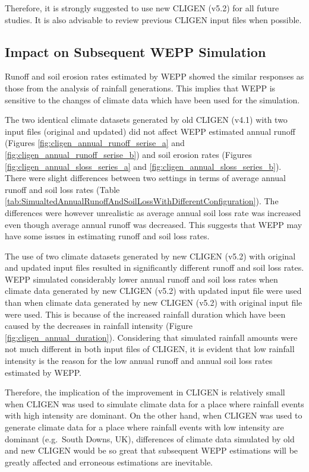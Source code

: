 Therefore, it is strongly suggested to use new CLIGEN (v5.2) for all future
studies. It is also advisable to review previous CLIGEN input files when
possible.

\subsection{Impact on Subsequent WEPP Simulation}

Runoff and soil erosion rates estimated by WEPP showed the similar responses as
those from the analysis of rainfall generations. This implies that WEPP is
sensitive to the changes of climate data which have been used for the
simulation.

The two identical climate datasets generated by old CLIGEN (v4.1) with two input
files (original and updated) did not affect WEPP estimated annual runoff
(Figures \ref{fig:cligen_annual_runoff_serise_a} and
\ref{fig:cligen_annual_runoff_serise_b}) and soil erosion rates (Figures
\ref{fig:cligen_annual_sloss_series_a} and
\ref{fig:cligen_annual_sloss_series_b}).
There were slight differences between two settings in terms of average annual
runoff and soil loss rates (Table
\ref{tab:SimualtedAnnualRunoffAndSoilLossWithDifferentConfiguration}). The
differences were however unrealistic as average annual soil loss rate was
increased even though average annual runoff was decreased. This suggests that
WEPP may have some issues in estimating runoff and soil loss rates.

The use of two climate datasets generated by new CLIGEN (v5.2) with original and
updated input files resulted in significantly different runoff and soil loss
rates. WEPP simulated considerably lower annual runoff and soil loss rates when
climate data generated by new CLIGEN (v5.2) with updated input file were used
than when climate data generated by new CLIGEN (v5.2) with original input file
were used. This is because of the increased rainfall duration which have
been caused by the decreases in rainfall intensity (Figure
\ref{fig:cligen_annual_duration}). Considering that simulated rainfall amounts
were not much different in both input files of CLIGEN, it is evident that low
rainfall intensity is the reason for the low annual runoff and annual soil loss
rates estimated by WEPP.

Therefore, the implication of the improvement in CLIGEN is relatively small when
CLIGEN was used to simulate climate data for a place where rainfall events
with high intensity are dominant. On the other hand, when CLIGEN was used
to generate climate data for a place where rainfall events with low intensity
are dominant (e.g.\ South Downs, UK), differences of climate data simulated by
old and new CLIGEN would be so great that subsequent WEPP estimations will be
greatly affected and erroneous estimations are inevitable.

